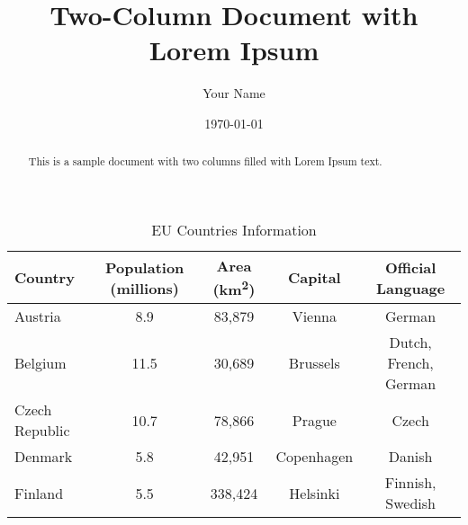\documentclass[twocolumn]{article}
\begin{document}
\title{Two-Column Document with Lorem Ipsum}
\author{Your Name}
\date{\today}

\maketitle

\begin{abstract}
This is a sample document with two columns filled with Lorem Ipsum text.
\end{abstract}


\lipsum[1-10] %

\pagebreak
\begin{table}[h]
    \centering
    \caption{EU Countries Information}
    \begin{tabular}{lcccc}
        \toprule
        \textbf{Country} & \textbf{Population (millions)} & \textbf{Area (km\textsuperscript{2})} & \textbf{Capital} & \textbf{Official Language} \\
        \midrule
        Austria & 8.9 & 83,879 & Vienna & German \\
        Belgium & 11.5 & 30,689 & Brussels & Dutch, French, German \\
        Czech Republic & 10.7 & 78,866 & Prague & Czech \\
        Denmark & 5.8 & 42,951 & Copenhagen & Danish \\
        Finland & 5.5 & 338,424 & Helsinki & Finnish, Swedish \\
        \bottomrule
    \end{tabular}
\end{table}
\end{document}
